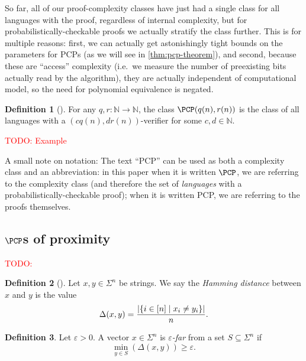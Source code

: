 \documentclass[english,12pt]{reedthesis}
\theoremstyle{plain}
\theoremstyle{definition}
\newtheorem{defn}[defn]{Definition}
\theoremstyle{remark}
\DeclarePairedDelimiter{\abs}{\lvert}{\rvert}
\newcommand{\TODO}[1]{\textcolor{red}{TODO: #1}}
\begin{document}
So far, all of our proof-complexity classes have just had a single class for all
languages with the proof, regardless of internal complexity, but for
probabilistically-checkable proofs we actually stratify the class further. This
is for multiple reasons: first, we can actually get astonishingly tight bounds
on the parameters for PCPs (as we will see in \cref{thm:pcp-theorem}), and
second, because these are ``access'' complexity (i.e.\ we measure the number of
preexisting bits actually read by the algorithm), they are actually independent
of computational model, so the need for polynomial equivalence is negated.

\begin{defn}[{\cite[Def.\ 18.1]{AB09}}]\label{def:pcp}
  For any $q, r: \mathbb{N} \rightarrow \mathbb{N}$, the class $\PCP(q(n), r(n))$ is the class of all
  languages with a $(cq(n), dr(n))$-verifier for some $c, d \in \mathbb{N}$.
\end{defn}

\TODO{Example}

A small note on notation: The text ``PCP'' can be used as both a complexity
class and an abbreviation: in this paper when it is written $\PCP$, we are
referring to the complexity class (and therefore the set of \emph{languages}
with a probabilistically-checkable proof); when it is written PCP, we are
referring to the proofs themselves.

\subsection{$\PCP$s of proximity}\label{sec:pcpp}

\TODO{}

\begin{defn}[{\cite{Ham50}}]\label{def:hamming-dist}
  Let $x, y \in \Sigma^{n}$ be strings. We say the \emph{Hamming distance} between $x$
  and $y$ is the value
  \[
    \Delta(x, y) = \frac{\abs{\{i \in [n] \mid x_{i} \ne y_{i}\}}}{n}.
  \]
\end{defn}

\begin{defn}\label{def:far}
  Let $\varepsilon > 0$. A vector $x \in \Sigma^{n}$ is \emph{$\varepsilon$-far} from a set $S \subseteq \Sigma^{n}$ if
  \[
    \min_{y \in S}(\Delta(x, y)) \ge \varepsilon.
  \]
\end{defn}
\end{document}
